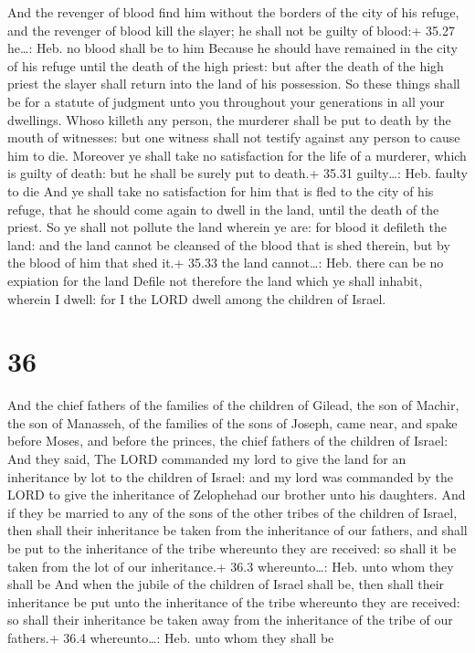  And the revenger of blood find him without the borders of
the city of his refuge, and the revenger of blood kill the slayer; he
shall not be guilty of blood:+ 35.27 he\ldots: Heb. no blood shall be to
him  Because he should have remained in the city of his
refuge until the death of the high priest: but after the death of the
high priest the slayer shall return into the land of his possession.
 So these things shall be for a statute of judgment unto
you throughout your generations in all your dwellings. 
Whoso killeth any person, the murderer shall be put to death by the
mouth of witnesses: but one witness shall not testify against any person
to cause him to die.  Moreover ye shall take no
satisfaction for the life of a murderer, which is guilty of death: but
he shall be surely put to death.+ 35.31 guilty\ldots: Heb. faulty to die
 And ye shall take no satisfaction for him that is fled to
the city of his refuge, that he should come again to dwell in the land,
until the death of the priest.  So ye shall not pollute the
land wherein ye are: for blood it defileth the land: and the land cannot
be cleansed of the blood that is shed therein, but by the blood of him
that shed it.+ 35.33 the land cannot\ldots: Heb. there can be no
expiation for the land  Defile not therefore the land which
ye shall inhabit, wherein I dwell: for I the LORD dwell among the
children of Israel.

\hypertarget{section-35}{%
\section{36}\label{section-35}}

 And the chief fathers of the families of the children of
Gilead, the son of Machir, the son of Manasseh, of the families of the
sons of Joseph, came near, and spake before Moses, and before the
princes, the chief fathers of the children of Israel:  And
they said, The LORD commanded my lord to give the land for an
inheritance by lot to the children of Israel: and my lord was commanded
by the LORD to give the inheritance of Zelophehad our brother unto his
daughters.  And if they be married to any of the sons of the
other tribes of the children of Israel, then shall their inheritance be
taken from the inheritance of our fathers, and shall be put to the
inheritance of the tribe whereunto they are received: so shall it be
taken from the lot of our inheritance.+ 36.3 whereunto\ldots: Heb. unto
whom they shall be  And when the jubile of the children of
Israel shall be, then shall their inheritance be put unto the
inheritance of the tribe whereunto they are received: so shall their
inheritance be taken away from the inheritance of the tribe of our
fathers.+ 36.4 whereunto\ldots: Heb. unto whom they shall be

